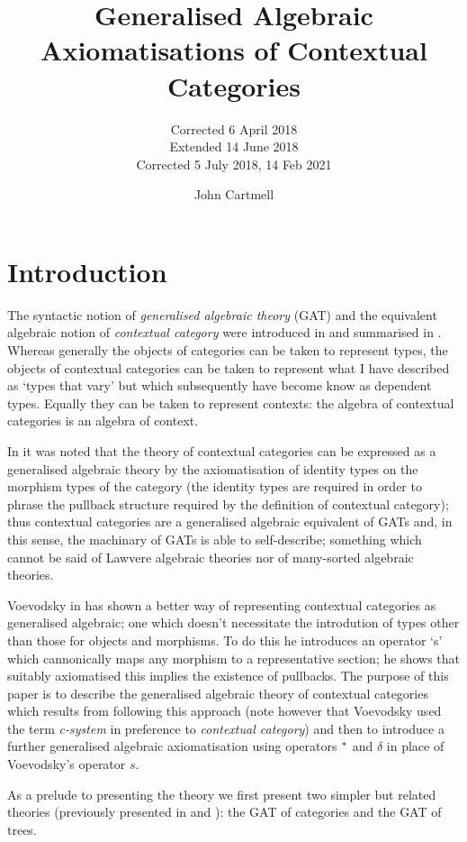 \documentclass[10pt,a4paper]{scrartcl}
\title{Generalised Algebraic Axiomatisations of Contextual Categories}
\subtitle{Corrected 6 April 2018 \\
          Extended 14 June 2018 \\
					Corrected 5 July 2018, 14 Feb 2021}
\author{John Cartmell}
\date{}
\begin{document}
\maketitle


\section{Introduction}
The syntactic notion of \textit{generalised algebraic theory} (GAT) and the  equivalent algebraic notion of \textit{contextual category} were introduced in  \cite{Cartmell78} and summarised in \cite{Cartmell86}. Whereas generally the objects of categories can be taken to represent types, the objects of contextual categories can be taken to represent what I have described as `types that vary' but which subsequently have become know as dependent types. Equally they can be taken to represent contexts: the algebra of contextual categories is an algebra of context. 

In \cite{Cartmell78} it was noted that the theory of contextual categories can be expressed as a generalised algebraic theory by the axiomatisation of identity types on the morphism types of the category 
(the identity types are required in order to phrase the pullback structure required by the definition of contextual category); thus contextual categories are a generalised algebraic equivalent of GATs and, in this sense, the machinary of GATs is able to self-describe; something which cannot be said of Lawvere algebraic theories nor of many-sorted algebraic theories.  

 Voevodsky in \cite{Voevodsky14C} has shown a better way of representing contextual categories as generalised algebraic; one which doesn't necessitate the introdution of types other than those for objects and morphisms. To do this he introduces an operator `s' which cannonically maps any morphism to a representative section; he shows that suitably axiomatised this implies the existence of pullbacks.  The purpose of this paper is to describe the generalised algebraic theory
of contextual categories which results from following this approach (note however that Voevodsky used the term \textit{c-system} in preference to \textit{contextual category}) and then to introduce a further generalised algebraic axiomatisation using operators $^*$ and $\delta$ in place of Voevodsky's operator $s$.   

As a prelude to presenting the theory we first present two simpler but related theories (previously presented in \cite{Cartmell78} and \cite{Cartmell86}): the GAT of categories and the GAT of trees.
\end{document}
